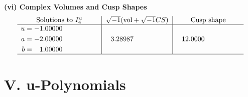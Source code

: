 \documentclass[1p]{elsarticle_modified}
\theoremstyle{definition}
\newcommand{\I}{\sqrt{-1}}
\begin{document}
\newpage\flushleft \textbf{(vi) Complex Volumes and Cusp Shapes}
$$\begin{array}{c|c|c}  
\text{Solutions to }I^u_{4}& \I (\text{vol} + \sqrt{-1}CS) & \text{Cusp shape}\\
 \hline 
\begin{aligned}
u &= -1.00000\phantom{ +0.000000I} \\
a &= -2.00000\phantom{ +0.000000I} \\
b &= \phantom{-}1.00000\phantom{ +0.000000I}\end{aligned}
 & \phantom{-}3.28987\phantom{ +0.000000I} & \phantom{-}12.0000\phantom{ +0.000000I}\\
 \hline 
 \end{array}$$\newpage
\newpage\renewcommand{\arraystretch}{1}
\centering \section*{ V. u-Polynomials}
\end{document}
